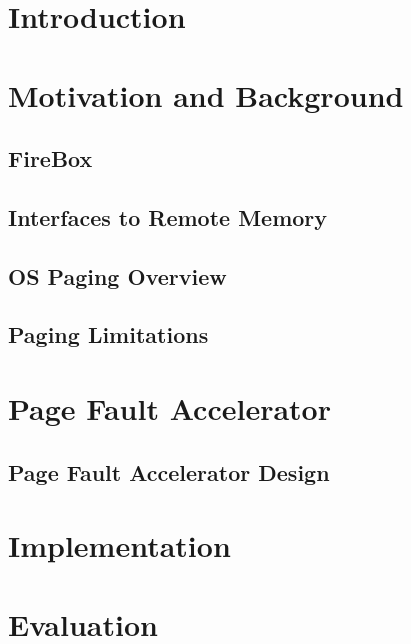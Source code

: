 \documentclass[12pt]{article}
\begin{document}




\newpage
\tableofcontents
\newpage

\section{Introduction} \label{sec:intro}
    

\section{Motivation and Background}
    \subsection{FireBox} \label{sec:firebox}
        
    \subsection{Interfaces to Remote Memory} \label{sec:rmemApproaches}
        
    \subsection{OS Paging Overview} \label{sec:pagingOverview}
        
    \subsection{Paging Limitations} \label{sec:pagingLimits}
        
        
\section{Page Fault Accelerator} \label{sec:pfa}
    
    \subsection{Page Fault Accelerator Design} \label{sec:pfaDesign}
        
        
\section{Implementation} \label{sec:impl}
    

\section{Evaluation} \label{sec:eval}
    
            
\end{document}
